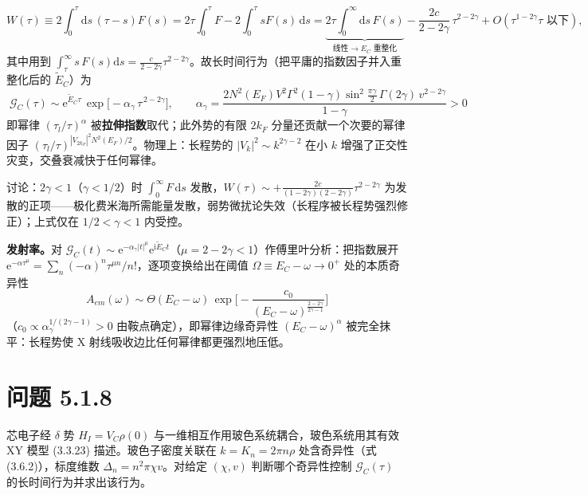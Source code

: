 \begin{equation*}
W(\tau)\equiv2\int_0^{\tau}\mathrm{d}s\,(\tau-s)F(s)
=2\tau\!\int_0^{\tau}\!F-2\!\int_0^{\tau}\!sF(s)\,\mathrm{d}s
=\underbrace{2\tau\!\int_0^{\infty}\!\!\mathrm{d}s\,F(s)}_{\text{线性}\to E_C\text{ 重整化}}-\frac{2c}{2-2\gamma}\,\tau^{2-2\gamma}+O(\tau^{1-2\gamma}\tau\text{ 以下}),
\end{equation*}
其中用到 $\int_\tau^\infty s\,F(s)\mathrm{d}s=\frac{c}{2-2\gamma}\tau^{2-2\gamma}$。故长时间行为（把平庸的指数因子并入重整化后的 $\tilde E_C$）为
\begin{equation*}
\boxed{\;\mathcal{G}_C(\tau)\sim\mathrm{e}^{\tilde E_C\tau}\,
\exp\!\Big[-\alpha_\gamma\,\tau^{\,2-2\gamma}\Big],\qquad
\alpha_\gamma=\frac{2N^{2}(E_F)V^{2}\Gamma^{2}(1-\gamma)\sin^{2}\frac{\pi\gamma}{2}\,\Gamma(2\gamma)\,v^{2-2\gamma}}{1-\gamma}>0\;}
\end{equation*}
即幂律 $(\tau_l/\tau)^{\alpha}$ 被\textbf{拉伸指数}取代；此外势的有限 $2k_F$ 分量还贡献一个次要的幂律因子 $(\tau_l/\tau)^{|V_{2k_F}|^{2}N^{2}(E_F)/2}$。物理上：长程势的 $|V_k|^{2}\sim k^{2\gamma-2}$ 在小 $k$ 增强了正交性灾变，交叠衰减快于任何幂律。

讨论：$2\gamma<1$（$\gamma<1/2$）时 $\int_0^\infty F\,\mathrm{d}s$ 发散，$W(\tau)\sim+\frac{2c}{(1-2\gamma)(2-2\gamma)}\tau^{2-2\gamma}$ 为发散的正项——极化费米海所需能量发散，弱势微扰论失效（长程序被长程势强烈修正）；上式仅在 $1/2<\gamma<1$ 内受控。

\textbf{发射率。}对 $\mathcal{G}_C(t)\sim\mathrm{e}^{-\alpha_\gamma|t|^{\mu}}\mathrm{e}^{\mathrm{i}\tilde E_Ct}$（$\mu=2-2\gamma<1$）作傅里叶分析：把指数展开 $\mathrm{e}^{-\alpha\tau^\mu}=\sum_n(-\alpha)^n\tau^{\mu n}/n!$，逐项变换给出在阈值 $\Omega\equiv E_C-\omega\to0^{+}$ 处的本质奇异性
\begin{equation*}
\boxed{\;A_{em}(\omega)\sim\Theta(E_C-\omega)\,
\exp\!\Big[-\frac{c_0}{(E_C-\omega)^{\frac{2-2\gamma}{2\gamma-1}}}\Big]\;}
\end{equation*}
（$c_0\propto\alpha_\gamma^{1/(2\gamma-1)}>0$ 由鞍点确定），即幂律边缘奇异性 $(E_C-\omega)^{\alpha}$ 被完全抹平：长程势使 X 射线吸收边比任何幂律都更强烈地压低。

\section*{问题 5.1.8}
\begin{problem}
芯电子经 $\delta$ 势 $H_I=V_C\rho(0)$ 与一维相互作用玻色系统耦合，玻色系统用其有效 XY 模型 (3.3.23) 描述。玻色子密度关联在 $k=K_n=2\pi n\rho$ 处含奇异性（式 (3.6.2)），标度维数 $\Delta_n=n^{2}\pi\chi v$。对给定 $(\chi,v)$ 判断哪个奇异性控制 $\mathcal{G}_C(\tau)$ 的长时间行为并求出该行为。
\end{problem}
\solution

